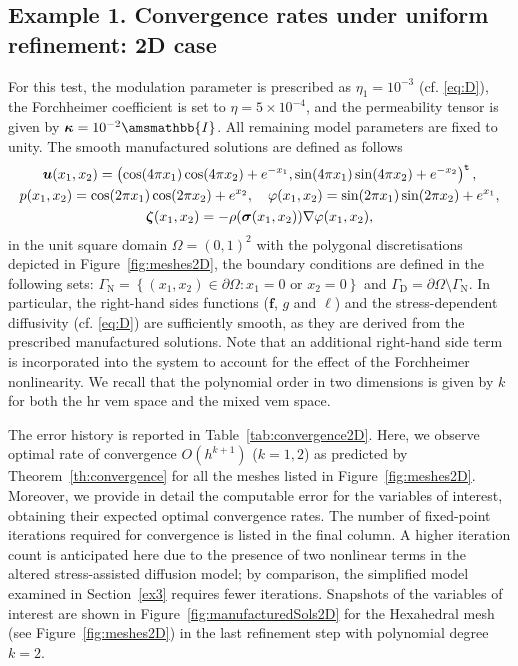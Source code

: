 \documentclass[fleqn,a4paper]{cas-sc}
\newcommand{\bu}{\boldsymbol{u}}
\newcommand{\bkappa}{\boldsymbol{\kappa}}
\newcommand{\bzeta}{\boldsymbol{\zeta}}
\newcommand{\0}{\boldsymbol{0}}
\newcommand\bbI{\amsmathbb{I}}
\newcommand\bsigma{\boldsymbol{\sigma}}
\numberwithin{equation}{section}
\numberwithin{figure}{section}
\begin{document}
\subsection{Example 1. Convergence rates under uniform refinement: 2D case} \label{sec:ex1}
For this test, the modulation parameter is prescribed as $\eta_1 = 10^{-3}$ (cf. \eqref{eq:D}), the Forchheimer coefficient is set to $\eta=5\times 10^{-4}$, and the permeability tensor is given by $\bkappa=10^{-2}\bbI$.  All remaining model parameters are fixed to unity. The smooth manufactured solutions are defined as follows
\begin{gather*}
  \bu(x_1,x_2) = \left( \cos(4\pi x_1)\cos(4\pi x_2)+e^{-x_1}, \sin(4\pi x_1)\sin(4\pi x_2)+e^{-x_2} \right)^{\tt t}, \\ p(x_1,x_2) = \cos(2\pi x_1)\cos(2\pi x_2) + e^{x_2}, \quad
  \varphi(x_1,x_2) = \sin(2\pi x_1)\sin(2\pi x_2) + e^{x_1}, \\ \bzeta(x_1,x_2) = -\rho(\bsigma(x_1,x_2))\nabla \varphi(x_1,x_2),
\end{gather*}
in the unit square domain $\Omega = (0,1)^2$ with the polygonal discretisations depicted in Figure~\ref{fig:meshes2D}, the boundary conditions are defined in the following sets: $\Gamma_{\mathrm{N}} = \left\{ (x_1,x_2)\in \partial \Omega : x_1=0 \text{ or } x_2=0\right\}$ and $\Gamma_{\mathrm{D}} = \partial \Omega \setminus \Gamma_{\mathrm{N}}$. In particular, the right-hand sides functions ($\mathbf{f}$, $g$ and $\ell$) and the stress-dependent diffusivity (cf. \eqref{eq:D}) are sufficiently smooth, as they are derived from the prescribed manufactured solutions.  {Note that an additional right-hand side term is incorporated into the system to account for the effect of the Forchheimer nonlinearity.} We recall that the polynomial order in two dimensions is given by $k$ for both the \gls{hr} \gls{vem} space and the mixed \gls{vem} space.

The error history is reported in Table~\ref{tab:convergence2D}. Here, we observe optimal rate of convergence $O(h^{k+1})$ ($k=1,2$) as predicted by {Theorem}~\ref{th:convergence} for all the meshes listed in Figure~\ref{fig:meshes2D}. Moreover, we {provide} in detail the computable error for the variables of interest, obtaining their expected optimal convergence rates. {The number of fixed-point iterations required for convergence is listed in the final column. A higher iteration count is anticipated here due to the presence of two nonlinear terms in the altered stress-assisted diffusion model; by comparison, the simplified model examined in Section~\ref{ex3} requires fewer iterations.} Snapshots of the variables of interest are shown in Figure~\ref{fig:manufacturedSols2D} for the Hexahedral mesh (see Figure~\ref{fig:meshes2D}) in the last refinement step with polynomial degree $k=2$.
\end{document}
